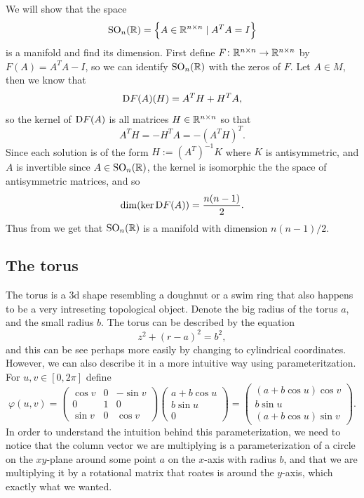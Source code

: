\documentclass[11pt,a4paper]{article}
\begin{document}
\begin{example}
  \label{exmp:SOn-one}
  We will show that the space
  \[
    \mathrm{SO}_n(\mathbb{R}) =
    \left\{A \in \mathbb{R}^{n \times n} \mid A^T A = I\right\}
  \]
  is a manifold and find its dimension.
  First define $F \colon \mathbb{R}^{n \times n} \to \mathbb{R}^{n \times n}$
  by $F(A) = A^T A - I$, so we can
  identify $\mathrm{SO}_n(\mathbb{R})$ with the zeros of $F$.
  Let $A \in M$, then we know that
  \[
    \mathrm{D} F(A)(H) = A^T H + H^T A,
  \]
  so the kernel of $\mathrm{D} F(A)$ is all matrices $H \in \mathbb{R}^{n \times n}$ so that
  \[
    A^T H = -H^T A = -(A^T H)^T.
  \]
  Since each solution is of the form $H := (A^T)^{-1} K$
  where $K$ is antisymmetric, and $A$ is invertible since $A \in \mathrm{SO}_n(\mathbb{R})$,
  the kernel is isomorphic the the space of antisymmetric matrices,
  and so
  \[
    \dim(\ker \mathrm{D} F(A)) = \frac{n (n - 1)}{2}.
  \]
  Thus from  we get that $\mathrm{SO}_n(\mathbb{R})$
  is a manifold with dimension $n (n - 1) / 2$.
\end{example}

\subsection{The torus}

\begin{example}[Torus]
  \label{exm:torus}
  The torus is a $3$d shape resembling a doughnut or a swim ring
  that also happens to be a very intreseting topological object.
  Denote the big radius of the torus $a$, and the small radius $b$.
  The torus can be described by the equation
  \[
    z^2 + (r - a)^2 = b^2,
  \]
  and this can be see perhaps more easily by changing to cylindrical
  coordinates.
  However, we can also describe it in a more intuitive way using
  parameteritzation.
  For $u,v \in [0,2\pi]$ define
  \[
    \varphi(u,v) =
    \begin{pmatrix}
      \cos v & 0 & - \sin v \\
      0 & 1 & 0 \\
      \sin v & 0 & \cos v
    \end{pmatrix}
    \begin{pmatrix}
      a + b \cos u \\
      b \sin u \\
      0
    \end{pmatrix} =
    \begin{pmatrix}
      (a + b \cos u) \cos v \\
      b \sin u \\
      (a + b \cos u) \sin v
    \end{pmatrix}.
  \]
  In order to understand the intuition behind this parameterization,
  we need to notice that the column vector
  we are multiplying is a parameterization of a circle on the $xy$-plane
  around some point $a$ on the $x$-axis with radius $b$, and that we are
  multiplying it by a rotational matrix that roates is around the $y$-axis,
  which exactly what we wanted.
\end{example}
\end{document}
